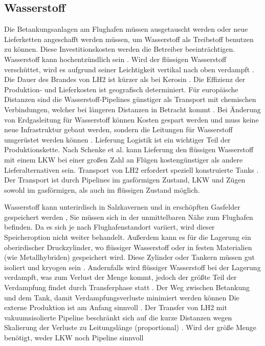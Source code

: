 \subsection{Wasserstoff}
%
Die Betankungsanlagen am Flughafen müssen ausgetauscht werden oder neue Lieferketten angeschafft werden müssen, 
um Wasserstoff als Treibstoff benutzen zu können.
Diese Investitionskosten werden die Betreiber beeinträchtigen. 
Wasserstoff kann hochentzündlich sein \cite{dalmia2022powering}. %
Wird der flüssigen Wasserstoff verschüttet, wird es aufgrund seiner Leichtigkeit vertikal nach oben verdampft \cite{colpan2022fuel}. 
Die Dauer des Brandes von LH2 ist kürzer als bei Kerosin \cite{colpan2022fuel}.
% 
Die Effizienz der Produktion- und Lieferkosten ist geografisch determiniert. 
Für europäische Distanzen sind die Wasserstoff-Pipelines günstiger als Transport mit chemischen Verbindungen, 
welcher bei längeren Distanzen in Betracht kommt \cite{undertaking2022strategic}. Bei Änderung von Erdgasleitung für Wasserstoff können Kosten gespart
werden und muss keine neue Infrastruktur gebaut werden, sondern die Leitungen für Wasserstoff umgerüstet werden können \cite{undertaking2022strategic}.
Lieferung
Logistik ist ein wichtiger Teil der Produktionskette. Nach Schenke et al. \cite{schenke2024lh2} kann Lieferung den flüssigen Wasserstoff mit einem LKW bei einer großen Zahl an Flügen 
kostengünstiger als andere Lieferalternativen sein. Transport von LH2 erfordert speziell konstruierte Tanks \cite{mulder2019outlook}.
Der Transport ist durch Pipelines im gasförmigen Zustand, LKW und Zügen sowohl im gasförmigen, als auch im flüssigen Zustand möglich. 

Wasserstoff kann unterirdisch in Salzkavernen und in erschöpften Gasfelder gespeichert werden \cite{undertaking2022strategic}, 
Sie müssen sich in der unmittelbaren Nähe zum Flughafen befinden. Da es sich je nach Flughafenstandort variiert, wird dieser Speicheroption nicht weiter behandelt.
Außerdem kann es für die Lagerung ein oberirdischer Druckzylinder, wo flüssiger Wasserstoff oder in festen Materialien (wie Metallhybriden) gespeichert wird.
Diese Zylinder oder Tankern müssen gut isoliert und kryogen sein \cite{undertaking2022strategic}.
Andernfalls wird flüssiger Wasserstoff bei der Lagerung verdampft, was zum Verlust der Menge kommt, 
jedoch der größte Teil der Verdampfung findet durch Transferphase statt \cite{undertaking2022strategic}.
Der Weg zwischen Betankung und dem Tank, damit Verdampfungsverluste minimiert werden können \cite{colpan2022fuel}
Die externe Produktion ist am Anfang sinnvoll \cite{colpan2022fuel}. Der Transfer von LH2 mit vakuumsisolierte Pipeline beschränkt sich auf die kurze Distanzen
wegen Skalierung der Verluste zu Leitungslänge (proportional) \cite{colpan2022fuel}.
Wird der größe Menge benötigt, weder LKW noch Pipeline sinnvoll \cite{colpan2022fuel}

